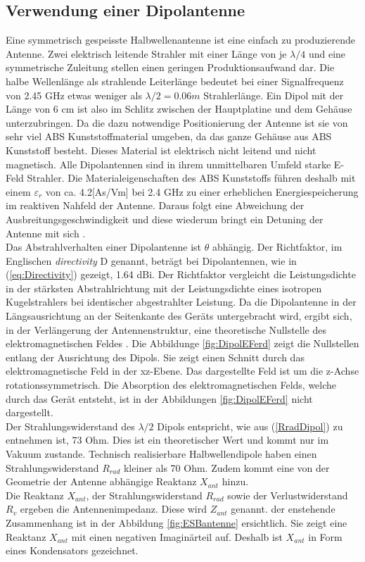 \subsection{Verwendung einer Dipolantenne}
Eine symmetrisch gespeisste Halbwellenantenne ist eine einfach zu produzierende Antenne. Zwei elektrisch leitende Strahler mit  einer Länge von je $\lambda/4$ und eine symmetrische Zuleitung stellen einen geringen Produktionsaufwand dar. Die halbe Wellenlänge als strahlende Leiterlänge bedeutet bei einer Signalfrequenz von 2.45 GHz etwas weniger als $\lambda/2=0.06m$ Strahlerlänge. Ein Dipol mit der Länge von 6 cm ist also im Schlitz zwischen der Hauptplatine und dem Gehäuse unterzubringen. 
Da die dazu notwendige Positionierung der Antenne ist sie von sehr viel ABS Kunststoffmaterial umgeben, da das ganze Gehäuse aus ABS Kunststoff besteht. Dieses Material ist elektrisch nicht leitend und nicht magnetisch. Alle Dipolantennen sind in ihrem unmittelbaren Umfeld starke E-Feld Strahler. Die Materialeigenschaften des ABS Kunststoffs führen deshalb mit einem $\varepsilon_r$ von ca. 4.2[As/Vm] bei 2.4 GHz zu einer erheblichen Energiespeicherung im reaktiven Nahfeld der Antenne. Daraus folgt eine Abweichung der Ausbreitungsgeschwindigkeit und diese wiederum bringt ein Detuning der Antenne mit sich \cite{WikiPermitt}.\\

Das Abstrahlverhalten einer Dipolantenne ist $\theta$ abhängig. Der Richtfaktor, im Englischen \textit{directivity} D genannt, beträgt bei Dipolantennen, wie in (\ref{eq:Directivity}) gezeigt, 1.64 dBi. Der Richtfaktor vergleicht die Leistungsdichte in der stärksten Abstrahlrichtung mit der Leistungsdichte eines isotropen Kugelstrahlers bei identischer abgestrahlter Leistung. Da die Dipolantenne in der Längsausrichtung an der Seitenkante des Geräts untergebracht wird, ergibt sich, in der Verlängerung der Antennenstruktur, eine theoretische Nullstelle des elektromagnetischen Feldes . Die Abbildunge \ref{fig:DipolEFerd} zeigt die Nullstellen entlang der Ausrichtung des Dipols. Sie zeigt einen Schnitt durch das elektromagnetische Feld in der xz-Ebene. Das dargestellte Feld ist um die z-Achse rotationssymmetrisch. Die Absorption des elektromagnetischen Felds, welche durch das Gerät entsteht, ist in der Abbildungen \ref{fig:DipolEFerd} nicht dargestellt.\\
Der Strahlungswiderstand des $\lambda/2$ Dipols entspricht, wie aus (\ref{RradDipol}) zu entnehmen ist, 73 Ohm. Dies ist ein theoretischer Wert und kommt nur im Vakuum zustande. Technisch realisierbare Halbwellendipole haben einen Strahlungswiderstand $R_{rad}$ kleiner als 70 Ohm. Zudem kommt eine von der Geometrie der Antenne abhängige Reaktanz $X_{ant}$ hinzu.\\
Die Reaktanz $X_{ant}$, der Strahlungswiderstand $R_{rad}$ sowie der Verlustwiderstand $R_v$ ergeben die Antennenimpedanz. Diese wird $Z_{ant}$ genannt. der enstehende Zusammenhang ist in der Abbildung \ref{fig:ESBantenne} ersichtlich. Sie zeigt eine Reaktanz $X_{ant}$ mit einen negativen Imaginärteil auf. Deshalb ist $X_{ant}$ in Form eines Kondensators gezeichnet.

